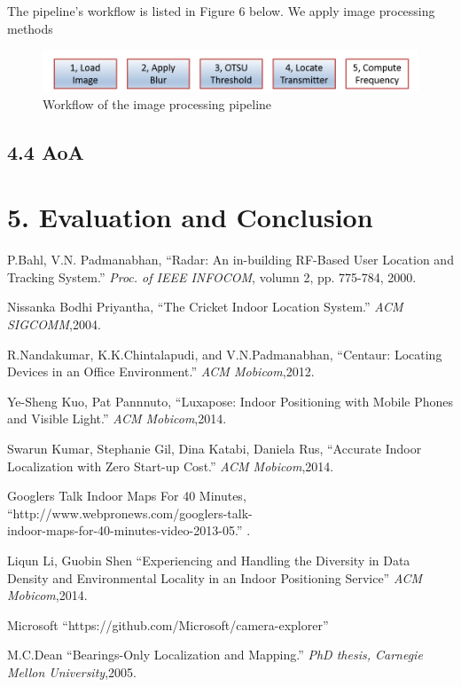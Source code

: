 \documentclass[a4paper, 11pt]{article} %
\begin{document}
The pipeline's workflow is listed in Figure 6 below. We apply image processing methods 
\begin{figure}[h]
	\centering 
	\includegraphics[width=0.8\linewidth]{Figure6.png}
	\caption{Workflow of the image processing pipeline}
	\label{fig:subfig}
\end{figure}


\subsection*{4.4 AoA}

\section*{5. Evaluation and Conclusion}


\begin{thebibliography}{10}
	
P.Bahl, V.N. Padmanabhan,
``Radar: An in-building RF-Based User Location and Tracking System.''
\textit{Proc. of IEEE INFOCOM}, volumn 2, pp. 775-784, 2000.

Nissanka Bodhi Priyantha,
``The Cricket Indoor Location System.''
\textit{ACM SIGCOMM},2004.

R.Nandakumar, K.K.Chintalapudi, and V.N.Padmanabhan,
``Centaur: Locating Devices in an Office Environment.''
\textit{ACM Mobicom},2012.

Ye-Sheng Kuo, Pat Pannnuto,
``Luxapose: Indoor Positioning with Mobile Phones and Visible Light.''
\textit{ACM Mobicom},2014.

Swarun Kumar, Stephanie Gil, Dina Katabi, Daniela Rus,
``Accurate Indoor Localization with Zero Start-up Cost.''
\textit{ACM Mobicom},2014.


Googlers Talk Indoor Maps For 40 Minutes,
``http://www.webpronews.com/googlers-talk-\\indoor-maps-for-40-minutes-video-2013-05.''
\textit{}.

Liqun Li, Guobin Shen
``Experiencing and Handling the Diversity in Data Density and Environmental Locality in an Indoor Positioning Service''
\textit{ACM Mobicom},2014.

Microsoft
``https://github.com/Microsoft/camera-explorer''
\textit{}

M.C.Dean
``Bearings-Only Localization and Mapping.''
\textit{PhD thesis, Carnegie Mellon University},2005.


\end{thebibliography}

\end{document}
